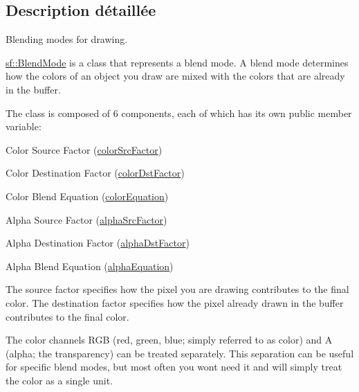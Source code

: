 \subsection{Description détaillée}
Blending modes for drawing. 

\hyperlink{structsf_1_1BlendMode}{sf\+::\+Blend\+Mode} is a class that represents a blend mode. A blend mode determines how the colors of an object you draw are mixed with the colors that are already in the buffer.

The class is composed of 6 components, each of which has its own public member variable\+: \begin{DoxyItemize}
\item Color Source Factor (\hyperlink{structsf_1_1BlendMode_a32d1a55dbfada86a06d9b881dc8ccf7b}{color\+Src\+Factor}) \item Color Destination Factor (\hyperlink{structsf_1_1BlendMode_adee68ee59e7f1bf71d12db03d251104d}{color\+Dst\+Factor}) \item Color Blend Equation (\hyperlink{structsf_1_1BlendMode_aed12f06eb7f50a1b95b892b0964857b1}{color\+Equation}) \item Alpha Source Factor (\hyperlink{structsf_1_1BlendMode_aa94e44f8e1042a7357e8eff78c61a1be}{alpha\+Src\+Factor}) \item Alpha Destination Factor (\hyperlink{structsf_1_1BlendMode_aaf85b6b7943181cc81745569c4851e4e}{alpha\+Dst\+Factor}) \item Alpha Blend Equation (\hyperlink{structsf_1_1BlendMode_a68f5a305e0912946f39ba6c9265710c4}{alpha\+Equation})\end{DoxyItemize}
The source factor specifies how the pixel you are drawing contributes to the final color. The destination factor specifies how the pixel already drawn in the buffer contributes to the final color.

The color channels R\+GB (red, green, blue; simply referred to as color) and A (alpha; the transparency) can be treated separately. This separation can be useful for specific blend modes, but most often you won\textquotesingle{}t need it and will simply treat the color as a single unit.

